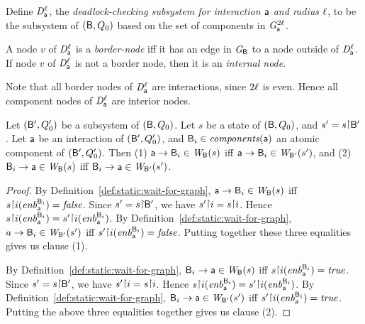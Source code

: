\begin{definition} \label{def:dsk}
Define $\mathit{D}_{\mathsf{a}}^{\ell}$, the \emph{deadlock-checking subsystem for interaction $\mathsf{a}$ and
radius $\ell$}, to be the subsystem of $(\mathsf{B}, Q_0)$ based on the set of %
components in $\mathit{G}_{\mathsf{a}}^{2\ell}$.  %
\end{definition}

\begin{definition}  \label{def:dsk.border-and internal}
A node $v$ of $\mathit{D}_{\mathsf{a}}^{\ell}$ is a \emph{border-node} iff it has an
edge in $\mathit{G}_{\mathsf{B}}$ to a node outside of $\mathit{D}_{\mathsf{a}}^{\ell}$.
If node $v$ of $\mathit{D}_{\mathsf{a}}^{\ell}$ is not a border node, then it is an \emph{internal node}.
\end{definition}
Note that all border nodes of  $\mathit{D}_{\mathsf{a}}^{\ell}$ are interactions,
since $2\ell$ is even. Hence all component nodes of $\mathit{D}_{\mathsf{a}}^{\ell}$ are
interior nodes.


\begin{proposition} \label{prop:edge-projection}
Let $(\mathsf{B}', Q'_0)$ be a subsystem of
$(\mathsf{B}, Q_0)$. Let $s$ be a state of $(\mathsf{B}, Q_0)$, and $s' = s \pj \B'$.
Let $\mathsf{a}$ be an interaction of $(\mathsf{B}', Q'_0)$, and $\mathsf{B}_i \in \mathit{components}(\mathsf{a})$ an atomic component of $(\mathsf{B}', Q'_0)$.
Then 
(1) $\mathsf{a} \rightarrow \mathsf{B}_i \in \mathit{W}_{\mathsf{B}}({s})$ iff $\mathsf{a} \rightarrow \mathsf{B}_i \in \mathit{W}_{\mathsf{B}'}({s'})$, and
(2) $\mathsf{B}_i \rightarrow \mathsf{a} \in \mathit{W}_{\mathsf{B}}({s})$ iff $\mathsf{B}_i \rightarrow \mathsf{a} \in \mathit{W}_{\mathsf{B}'}({s'})$.
\end{proposition}
%
\begin{proof}
By Definition~\ref{def:static:wait-for-graph}, $\mathsf{a} \rightarrow \mathsf{B}_i \in \mathit{W}_{\mathsf{B}}({s})$ iff $s \pj i (\gd{\act}{\B_i}) = \false$.
Since $s' = s \pj \B'$, we have $s' \pj i = s \pj i$. Hence
$s \pj i (\gd{\act}{\B_i}) = s' \pj i (\gd{\act}{\B_i})$.
By Definition~\ref{def:static:wait-for-graph}, 
$a \rightarrow \mathsf{B}_i \in \mathit{W}_{\mathsf{B}'}({s'})$ iff $s' \pj i (\gd{\act}{\B_i}) = \false$.
Putting together these three equalities gives us clause (1).

By Definition~\ref{def:static:wait-for-graph},
$\mathsf{B}_i \rightarrow \mathsf{a} \in \mathit{W}_{\mathsf{B}}({s})$ iff 
$s \pj i (\gd{\act}{\B_i}) = \true$.
Since $s' = s \pj \B'$, we have $s' \pj i = s \pj i$. Hence
$s \pj i (\gd{\act}{\B_i}) = s' \pj i (\gd{\act}{\B_i})$.
By Definition~\ref{def:static:wait-for-graph},
$\mathsf{B}_i \rightarrow \mathsf{a} \in \mathit{W}_{\mathsf{B}'}({s'})$ iff $s' \pj i (\gd{\act}{\B_i}) = \true$.
Putting the above three equalities together gives us clause (2).
\end{proof}

